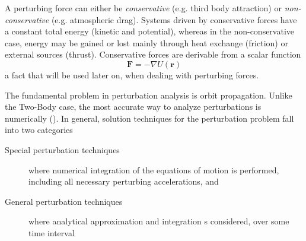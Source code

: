 A perturbing force can either be \emph{conservative}
(e.g. third body attraction) or \emph{non-conservative} (e.g. atmospheric drag). 
Systems driven by conservative forces have a constant total energy (kinetic and potential), 
whereas in the non-conservative case, energy may be gained or lost mainly through 
heat exchange (friction) or external sources (thrust). Conservative forces are 
derivable from a scalar function
\begin{equation}
  \bm{F} = -\nabla U(\bm{r})
\end{equation}
a fact that will be used later on, when dealing with perturbing forces.

The fundamental problem in perturbation analysis is orbit propagation. Unlike the 
Two-Body case, the most accurate way to analyze perturbations is numerically (\cite{Vallado2001}).
In general, solution techniques for the perturbation problem fall into two categories 
\begin{description}
  \item[Special perturbation techniques] where numerical integration of the equations 
  of motion is performed, including all necessary perturbing accelerations, and
  \item[General perturbation techniques] where analytical approximation and 
  integration s considered, over some time interval
\end{description}

